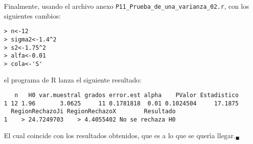 \begin{solucion}
 Finalmente, usando el archivo anexo \texttt{P11\_Prueba\_de\_una\_varianza\_02.r}, con los siguientes cambios:
 \begin{verbatim}
> n<-12
> sigma2<-1.4^2
> s2<-1.75^2
> alfa<-0.01
> cola<-'S'
 \end{verbatim}
 \vspace{-0.5cm}
 el programa de R lanza el siguiente resultado:
 \begin{verbatim}
   n   H0 var.muestral grados error.est alpha    PValor Estadistico
1 12 1.96       3.0625     11 0.1781818  0.01 0.1024504     17.1875
  RegionRechazoJi RegionRechazoX        Resultado
1    > 24.7249703    > 4.4055402 No se rechaza H0
 \end{verbatim}
 \vspace{-0.5cm}
 El cual coincide con los resultados obtenidos,
 que es a lo que se quer\'{\i}a llegar.${}_{\blacksquare}$
\end{solucion}
